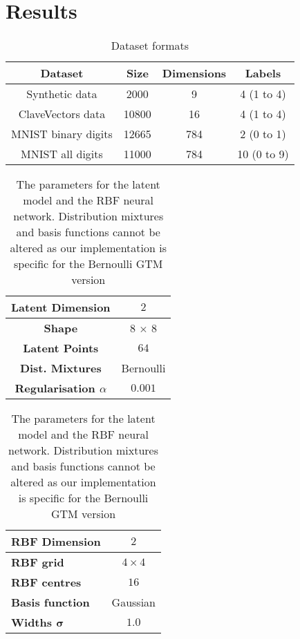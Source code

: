 

\newpage
\cleardoublepage
\appendix
\chapter{Results}


\begin{table}[H]
	\centering
	\begin{tabular}{|c|c|c| c|} \hline
		\textbf{Dataset} & \textbf{Size} & \textbf{Dimensions} & \textbf{Labels} \\ \hline \hline 
		Synthetic data & 2000 &  9 &  4 (1 to 4) \\ \hline 
		ClaveVectors data & 10800 & 16  &  4 (1 to 4) \\ \hline 
		MNIST binary digits & 12665 & 784 &  2 (0 to 1) \\ \hline 
		MNIST all digits & 11000 & 784 &  10 (0 to 9) \\ \hline 
	\end{tabular}
	\caption{Dataset formats}
	\label{datasets}
\end{table}

\begin{table}[H]
	\centering
	\begin{tabular}{|c|c|} \hline
		\textbf{Latent Dimension} & $2$ \\ \hline
		\textbf{Shape} & 8 $\times$ $8$ \\ \hline
		\textbf{Latent Points} &  $64$\\ \hline
		\textbf{Dist. Mixtures} &  Bernoulli\\ \hline \hline
		\textbf{Regularisation $\alpha$ } & $0.001$ \\ \hline
	\end{tabular}
	\hspace*{0.5cm}
	\begin{tabular}{|l|c|} \hline
		\textbf{RBF Dimension} & $2$ \\ \hline
		\textbf{RBF grid}  & $4\times4$ \\ \hline 
		\textbf{RBF centres} & $16$ \\ \hline
		\textbf{Basis function} & Gaussian \\ \hline
	    \textbf{Widths $\bm{\sigma}$} & $1.0$\\ \hline
	\end{tabular}
	\caption{The parameters for the latent model and the RBF neural network. Distribution mixtures and basis functions cannot be altered as our implementation is specific for the Bernoulli GTM version}
	\label{eval:model}
\end{table}




